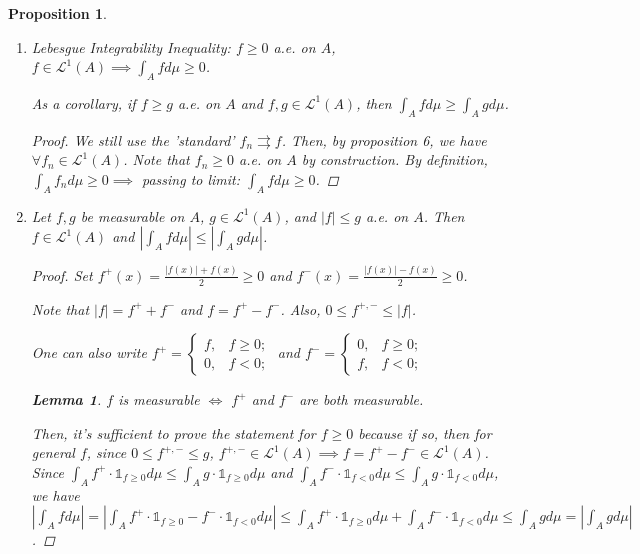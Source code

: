 \documentclass[12pt]{article}
\theoremstyle{blueplain}
\newtheorem{proposition}[theorem]{Proposition}
\newtheorem{lemma}[theorem]{Lemma}
\theoremstyle{bluedef}
\theoremstyle{blueremark}
\numberwithin{equation}{section}
\begin{document}
\begin{proposition}
\begin{enumerate}
          In fact, we can also prove by contradiction, which focuses on the definition of the Lebeegue integrability of $f$.

    \item Lebesgue Integrability Inequality: $f \geq 0$ a.e. on $A$, $f \in \mathcal{L}^1(A) \implies \int_A f d\mu \geq 0$.

          As a corollary, if $f \geq g$ a.e. on $A$ and $f,g \in \mathcal{L}^1(A)$, then $\int_A f d\mu \geq \int_A g d\mu$.
          \begin{proof}
            We still use the 'standard' $f_n \rightrightarrows f$. Then, by proposition 6, we have $\forall f_n \in \mathcal{L}^1(A)$. Note that $f_n \geq 0$ a.e. on $A$ by construction. By definition, $\int_A f_n d\mu \geq 0 \implies$ passing to limit: $\int_A f d\mu \geq 0$.
          \end{proof}

    \item Let $f,g$ be measurable on $A$, $g \in \mathcal{L}^1(A)$, and $|f| \leq g$ a.e. on $A$. Then $f \in \mathcal{L}^1(A)$ and $|\int_A f d\mu| \leq |\int_A g d\mu|$.
          \begin{proof}
            Set $f^+(x) = \frac{|f(x)| + f(x)}{2} \geq 0$ and $f^-(x) = \frac{|f(x)| - f(x)}{2} \geq 0$.

            Note that $|f| = f^+ + f^-$ and $f = f^+ - f^-$. Also, $0 \leq f^{+,-} \leq |f|$.

            One can also write $f^+ = \begin{cases} f, & f \geq 0; \\ 0, & f < 0; \end{cases}$ and $f^- = \begin{cases} 0, & f \geq 0; \\ f, & f < 0; \end{cases}$

            \begin{lemma}
              $f$ is measurable $\iff$ $f^+$ and $f^-$ are both measurable.
            \end{lemma}

            Then, it's sufficient to prove the statement for $f \geq 0$ because if so, then for general $f$, since $0 \leq f^{+,-} \leq g$, $f^{+,-} \in \mathcal{L}^1(A) \implies f = f^+ - f^- \in \mathcal{L}^1(A)$. Since $\int_A f^+ \cdot \mathds{1}_{f \geq 0} d\mu \leq \int_A g \cdot \mathds{1}_{f \geq 0} d\mu$ and $\int_A f^- \cdot \mathds{1}_{f < 0} d\mu \leq \int_A g \cdot \mathds{1}_{f < 0} d\mu$, we have $|\int_A f d\mu| = |\int_A f^+ \cdot \mathds{1}_{f \geq 0} - f^- \cdot \mathds{1}_{f < 0} d\mu| \leq \int_A f^+ \cdot \mathds{1}_{f \geq 0} d\mu + \int_A f^- \cdot \mathds{1}_{f < 0} d\mu \leq \int_A g d\mu = |\int_A g d\mu|$.


\end{proof}
\end{enumerate}
\end{proposition}
\end{document}
